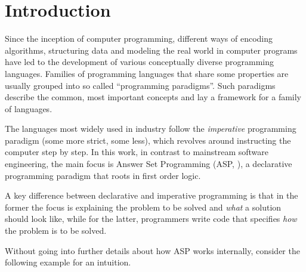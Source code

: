 \documentclass{vutinfth} %
\begin{document}
\tableofcontents* %

\mainmatter

\chapter{Introduction}
\label{chap:intro}

Since the inception of computer programming, different ways of encoding algorithms, structuring data and modeling the real world in computer programs have led to the development of various conceptually diverse programming languages. Families of programming languages that share some properties are usually grouped into so called \enquote{programming paradigms}.
Such paradigms describe the common, most important concepts and lay a framework for a family of languages.

The languages most widely used in industry follow the \emph{imperative} programming paradigm (some more strict, some less), which revolves around instructing the computer step by step. In this work, in contrast to mainstream software engineering, the main focus is Answer Set Programming (ASP, \cite{stable}), a declarative programming paradigm that roots in first order logic.

A key difference between declarative and imperative programming is that in the former the focus is explaining the problem to be solved and \emph{what} a solution should look like, while for the latter, programmers write code that specifies \emph{how} the problem is to be solved.

Without going into further details about how ASP works internally, consider the following example for an intuition.
\end{document}
